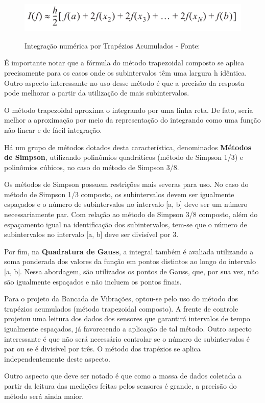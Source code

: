 \begin{figure}[H]
\centering
\includegraphics[keepaspectratio=true,scale=0.52]	{figuras/metodo_trapezoidal.png}
\label{fig:metodo_trapezoidal}
\caption{Integração numérica por Trapézios Acumulados - Fonte: }
\end{figure}

É importante notar que a fórmula do método trapezoidal composto se aplica precisamente para os casos onde os subintervalos têm uma largura h idêntica. Outro aspecto interessante no uso desse método é que a precisão da resposta pode melhorar a partir da utilização de mais subintervalos.

O método trapezoidal aproxima o integrando por uma linha reta. De fato, seria melhor a aproximação por meio da representação do integrando como uma função não-linear e de fácil integração.

Há um grupo de métodos dotados desta característica, denominados \textbf{Métodos de Simpson}, utilizando polinômios quadráticos (método de Simpson 1/3) e polinômios cúbicos, no caso do método de Simpson 3/8.

Os métodos de Simpson possuem restrições mais severas para uso. No caso do método de Simpson 1/3 composto, os subintervalos devem ser igualmente espaçados e o número de subintervalos no intervalo [a, b] deve ser um número necessariamente par. Com relação ao método de Simpson 3/8 composto, além do espaçamento igual na identificação dos subintervalos, tem-se que o número de subintervalos no intervalo [a, b] deve ser divisível por 3.

Por fim, na \textbf{Quadratura de Gauss}, a integral também é avaliada utilizando a soma ponderada dos valores da função em pontos distintos ao longo do intervalo [a, b]. Nessa abordagem, são utilizados os pontos de Gauss, que, por sua vez, não são igualmente espaçados e não incluem os pontos finais.

Para o projeto da Bancada de Vibrações, optou-se pelo uso do método dos trapézios acumulados (método trapezoidal composto). A frente de controle projetou uma leitura dos dados dos sensores que garantirá intervalos de tempo igualmente espaçados, já favorecendo a aplicação de tal método. Outro aspecto interessante é que não será necessário controlar se o número de subintervalos é par ou se é divisível por três. O método dos trapézios se aplica independentemente deste aspecto.

Outro aspecto que deve ser notado é que como a massa de dados coletada a partir da leitura das medições feitas pelos sensores é grande, a precisão do método será ainda maior.